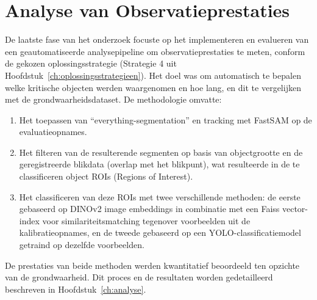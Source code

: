 \section{Analyse van Observatieprestaties}

De laatste fase van het onderzoek focuste op het implementeren en evalueren van een geautomatiseerde analysepipeline om observatieprestaties te meten, conform de gekozen oplossingsstrategie (Strategie 4 uit Hoofdstuk~\ref{ch:oplossingsstrategieen}). Het doel was om automatisch te bepalen welke kritische objecten werden waargenomen en hoe lang, en dit te vergelijken met de grondwaarheidsdataset. De methodologie omvatte:
\begin{enumerate}
  \item Het toepassen van ``everything-segmentation'' en tracking met FastSAM op de evaluatieopnames.
  \item Het filteren van de resulterende segmenten op basis van objectgrootte en de geregistreerde 
  blikdata (overlap met het blikpunt), wat resulteerde in de te classificeren object ROIs (Regions of Interest).
  \item Het classificeren van deze ROIs met twee verschillende methoden: de eerste gebaseerd op DINOv2 image 
  embeddings in combinatie met een Faiss vector-index voor similariteitsmatching tegenover voorbeelden uit de kalibratieopnames, 
  en de tweede gebaseerd op een YOLO-classificatiemodel getraind op dezelfde voorbeelden.
\end{enumerate}
De prestaties van beide methoden werden kwantitatief beoordeeld ten opzichte van de grondwaarheid. 
Dit proces en de resultaten worden gedetailleerd beschreven in Hoofdstuk~\ref{ch:analyse}.
